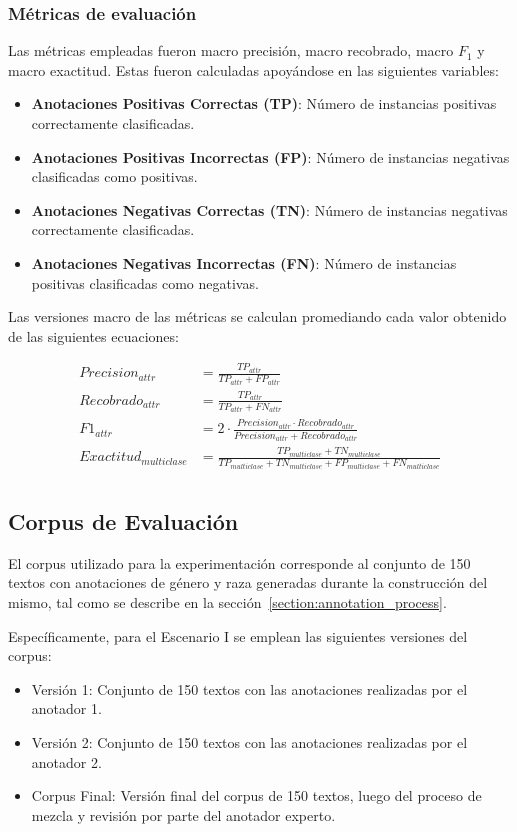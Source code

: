 \subsubsection{M\'etricas de evaluaci\'on}
Las m\'etricas empleadas fueron macro precisi\'on, macro recobrado, macro $F_1$ y 
macro exactitud. Estas fueron calculadas apoy\'andose en las siguientes variables: 

\begin{itemize}
    \item \textbf{Anotaciones Positivas Correctas (TP)}: N\'umero de instancias positivas correctamente clasificadas.
    \item \textbf{Anotaciones Positivas Incorrectas (FP)}: N\'umero de instancias negativas clasificadas como positivas.
    \item \textbf{Anotaciones Negativas Correctas (TN)}: N\'umero de instancias negativas correctamente clasificadas.
    \item \textbf{Anotaciones Negativas Incorrectas (FN)}: N\'umero de instancias positivas clasificadas como negativas.
\end{itemize}

Las versiones macro de las m\'etricas se calculan promediando cada valor obtenido de las siguientes ecuaciones:

\begin{align}
    Precision_{attr} &= \frac{TP_{attr}}{TP_{attr} + FP_{attr}}\\
    Recobrado_{attr} &= \frac{TP_{attr}}{TP_{attr} + FN_{attr}}\\
    F1_{attr} &= 2 \cdot \frac{{Precision_{attr}} \cdot {Recobrado_{attr}}}{{Precision_{attr}} + {Recobrado_{attr}}}\\
    Exactitud_{multiclase} &= \frac{TP_{multiclase} + TN_{multiclase}}{TP_{multiclase} + TN_{multiclase} + FP_{multiclase} + FN_{multiclase}}\\
\end{align}


\subsection{Corpus de Evaluaci\'on}
El corpus utilizado para la experimentaci\'on corresponde al conjunto de 150 textos con anotaciones de g\'enero y raza
generadas durante la construcci\'on del mismo, tal como se describe en la secci\'on~\ref{section:annotation_process}.

Espec\'ificamente, para el Escenario I se emplean las siguientes versiones del corpus:
\begin{itemize}
    \item Versi\'on 1: Conjunto de 150 textos con las anotaciones realizadas por el anotador 1.
    \item Versi\'on 2: Conjunto de 150 textos con las anotaciones realizadas por el anotador 2.
    \item Corpus Final: Versi\'on final del corpus de 150 textos, luego del proceso de mezcla y revisi\'on por parte 
    del anotador experto.
\end{itemize}

